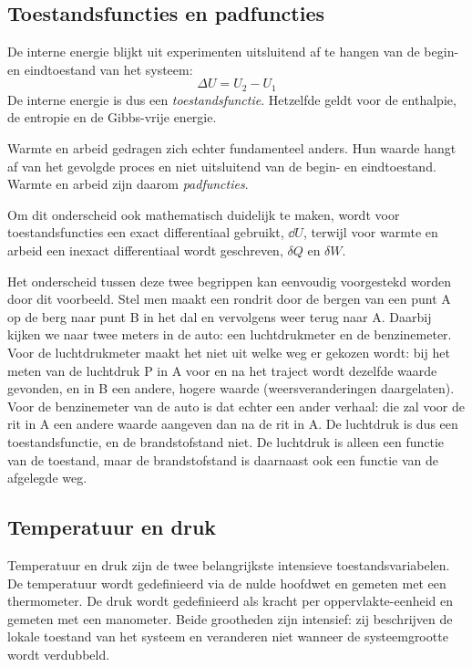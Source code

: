 \subsection{Toestandsfuncties en padfuncties}

De interne energie blijkt uit experimenten uitsluitend af te hangen van de begin- en eindtoestand van het systeem:
\begin{equation*}
\Delta U = U_2 - U_1
\end{equation*}
De interne energie is dus een \emph{toestandsfunctie}. Hetzelfde geldt voor de enthalpie, de entropie en de Gibbs-vrije energie.

Warmte en arbeid gedragen zich echter fundamenteel anders. Hun waarde hangt af van het gevolgde proces en niet uitsluitend van de begin- en eindtoestand. Warmte en arbeid zijn daarom \emph{padfuncties}.

Om dit onderscheid ook mathematisch duidelijk te maken, wordt voor toestandsfuncties een exact differentiaal gebruikt, $\dd U$, terwijl voor warmte en arbeid een inexact differentiaal wordt geschreven, $\delta Q$ en $\delta W$.

Het onderscheid tussen deze twee begrippen kan eenvoudig voorgestekd worden door dit voorbeeld. Stel men maakt een rondrit door de bergen van een punt A op de berg naar punt B in het dal en vervolgens weer terug naar A. Daarbij kijken we naar twee meters in de auto: een luchtdrukmeter en de benzinemeter. Voor de luchtdrukmeter maakt het niet uit welke weg er gekozen wordt: bij het meten van de luchtdruk P in A voor en na het traject wordt dezelfde waarde gevonden, en in B een andere, hogere waarde (weersveranderingen daargelaten). Voor de benzinemeter van de auto is dat echter een ander verhaal: die zal voor de rit in A een andere waarde aangeven dan na de rit in A. De luchtdruk is dus een toestandsfunctie, en de brandstofstand niet. De luchtdruk is alleen een functie van de toestand, maar de brandstofstand is daarnaast ook een functie van de afgelegde weg.

\subsection{Temperatuur en druk}

Temperatuur en druk zijn de twee belangrijkste intensieve toestandsvariabelen. De temperatuur wordt gedefinieerd via de nulde hoofdwet en gemeten met een thermometer. De druk wordt gedefinieerd als kracht per oppervlakte-eenheid en gemeten met een manometer. Beide grootheden zijn intensief: zij beschrijven de lokale toestand van het systeem en veranderen niet wanneer de systeemgrootte wordt verdubbeld.

